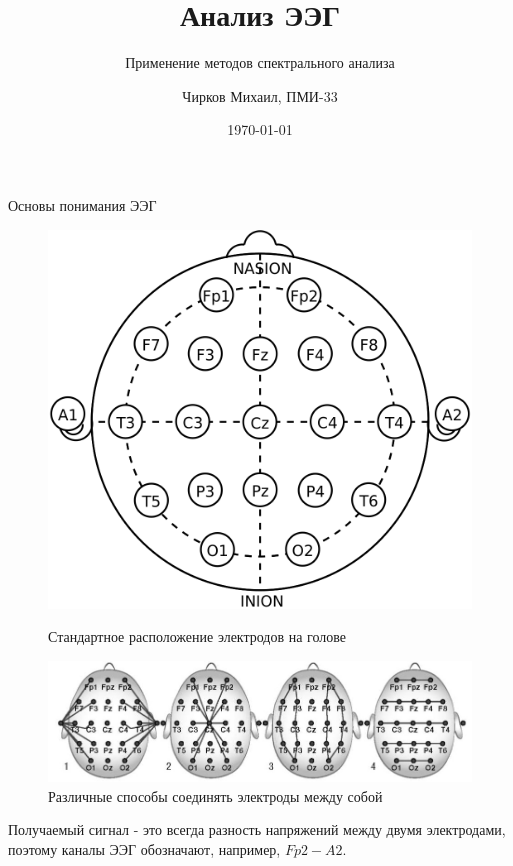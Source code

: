 \documentclass[10pt, red]{beamer}
\title{Анализ ЭЭГ}
\subtitle{Применение методов спектрального анализа}
\author{Чирков Михаил, ПМИ-33}
\institute{ЯрГУ им. П.Г. Демидова}
\date{\today}
\begin{document}
\begin{frame}
    \titlepage
\end{frame}

\begin{frame}{Основы понимания ЭЭГ}

\begin{figure}[h]
\begin{center}
\begin{minipage}[h]{0.3\linewidth}
\includegraphics[width=1\linewidth]{src/20-10.png}
\caption{Стандартное расположение электродов на голове} %
\label{pic:20-10} %
\end{minipage} \; \;
\begin{minipage}[h]{0.55\linewidth}
\includegraphics[width=1.2\linewidth]{src/Монтаж_ЭЭГ.jpg}
\caption{Различные способы соединять электроды между собой}
\label{pic:montage}
\end{minipage}
\end{center}
\end{figure}

Получаемый сигнал - это всегда разность напряжений между двумя электродами, поэтому каналы ЭЭГ обозначают, например, $Fp2 - A2$.
\end{frame}
\end{document}
